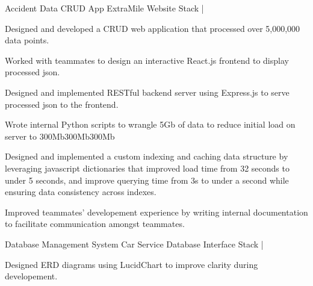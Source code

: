 \begin{cventries}
    \cventry
    {Accident Data CRUD App} %
    {ExtraMile Website} %
    {\href{https://github.com/giathuan123/extramile}{\faGithubSquare}} %
    {Stack | \diExpressOriginal \diReactPlainWordmark \diNodejsPlain \diPythonPlain } %
    {
        \begin{cvitems} %
        \item{Designed and developed a CRUD web application that processed over 5,000,000 data points. }
        \item{Worked with teammates to design an interactive React.js frontend to display processed json.}
        \item{Designed and implemented RESTful backend server using Express.js to serve processed json to the frontend. }
        \item{Wrote internal Python scripts to wrangle 5Gb of data to reduce initial load on server to 300Mb300Mb300Mb }
        \item{Designed and implemented a custom indexing and caching data structure by leveraging javascript dictionaries that improved load time from 32 seconds to under 5 seconds, and improve querying time from 3s to under a second while ensuring data consistency across indexes. }
        \item{Improved teammates' developement experience by writing internal documentation to facilitate communication amongst teammates. }
        \end{cvitems}
    }
    \cventry
    {Database Management System} %
    {Car Service Database Interface} %
    {\href{https://github.com/giathuan123/cs166-project}{\faGithubSquare}} %
    {Stack | \diJavaPlain \diPostgresqlPlain } %
    {
        \begin{cvitems} %
        \item{Designed ERD diagrams using LucidChart to improve clarity during developement. }

\end{cvitems}}
\end{cventries}
